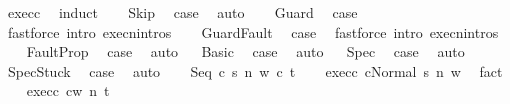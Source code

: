 \begin{isabellebody}
%
\isadelimproof
%
\endisadelimproof
%
\isatagproof
{}\isamarkupfalse%
\ exec{\isacharunderscore}c\ \isanewline
{}\isamarkupfalse%
\ {\isacharparenleft}induct{\isacharparenright}\isanewline
\ \ \isamarkupfalse%
\ Skip\ \isamarkupfalse%
\ {\isacharquery}case\ \isamarkupfalse%
\ auto\isanewline
{}\isamarkupfalse%
\isanewline
\ \ \isamarkupfalse%
\ Guard\ \isamarkupfalse%
\ {\isacharquery}case\ \isamarkupfalse%
\ {\isacharparenleft}fastforce\ intro{\isacharcolon}\ execn{\isachardot}intros{\isacharparenright}\isanewline
{}\isamarkupfalse%
\isanewline
\ \ \isamarkupfalse%
\ GuardFault\ \isamarkupfalse%
\ {\isacharquery}case\ \isamarkupfalse%
\ {\isacharparenleft}fastforce\ intro{\isacharcolon}\ execn{\isachardot}intros{\isacharparenright}\isanewline
{}\isamarkupfalse%
\isanewline
\ \ \isamarkupfalse%
\ FaultProp\ \isamarkupfalse%
\ {\isacharquery}case\ \isamarkupfalse%
\ auto\isanewline
{}\isamarkupfalse%
\isanewline
\ \isamarkupfalse%
\ Basic\ \isamarkupfalse%
\ {\isacharquery}case\ \isamarkupfalse%
\ auto\isanewline
{}\isamarkupfalse%
\isanewline
\ \isamarkupfalse%
\ Spec\ \isamarkupfalse%
\ {\isacharquery}case\ \isamarkupfalse%
\ auto\isanewline
{}\isamarkupfalse%
\isanewline
\ \isamarkupfalse%
\ SpecStuck\ \isamarkupfalse%
\ {\isacharquery}case\ \isamarkupfalse%
\ auto\isanewline
{}\isamarkupfalse%
\isanewline
\ \ \isamarkupfalse%
\ {\isacharparenleft}Seq\ c{}\ s\ n\ w\ c{}\ t{\isacharparenright}\isanewline
\ \ \isamarkupfalse%
\ exec{\isacharunderscore}c{}{\isacharcolon}\ {\isachardoublequoteopen}{\isasymGamma}{\isasymturnstile}{\isasymlangle}c{}{\isacharcomma}Normal\ s{\isasymrangle}\ {\isacharequal}n{\isasymRightarrow}\ w{\isachardoublequoteclose}\ \isamarkupfalse%
\ fact\isanewline
\ \ \isamarkupfalse%
\ exec{\isacharunderscore}c{}{\isacharcolon}\ {\isachardoublequoteopen}{\isasymGamma}{\isasymturnstile}{\isasymlangle}c{}{\isacharcomma}w{\isasymrangle}\ {\isacharequal}n{\isasymRightarrow}\ t{\isachardoublequoteclose}\ \isamarkupfalse%

\end{isabellebody}
